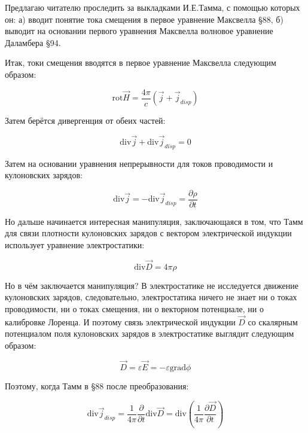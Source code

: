 \documentclass[12pt, a4paper]{article}
\begin{document}
Предлагаю читателю проследить за выкладками И.Е.Тамма, с помощью которых он: а) вводит понятие тока смещения в первое уравнение Максвелла §88, б) выводит на основании первого уравнения Максвелла волновое уравнение Даламбера §94.

Итак, токи смещения вводятся в первое уравнение Максвелла следующим образом:

\begin{equation}
\text{rot} \vec{H} = \frac{4\pi}{c} (\vec{j} + \vec{j}_{disp})
\label{eq:tamm_88}
\end{equation}

Затем берётся дивергенция от обеих частей:

\begin{equation}
\text{div} \vec{j} + \text{div} \vec{j}_{disp} = 0
\label{eq:tamm_div}
\end{equation}

Затем на основании уравнения непрерывности для токов проводимости и кулоновских зарядов:

\begin{equation}
\text{div} \vec{j} = -\text{div} \vec{j}_{disp} = \frac{\partial \rho}{\partial t}
\label{eq:tamm_continuity}
\end{equation}

Но дальше начинается интересная манипуляция, заключающаяся в том, что Тамм для связи плотности кулоновских зарядов с вектором электрической индукции использует уравнение электростатики:

\begin{equation}
\text{div} \vec{D} = 4\pi \rho
\label{eq:tamm_electrostatics}
\end{equation}

Но в чём заключается манипуляция? В электростатике не исследуется движение кулоновских зарядов, следовательно, электростатика ничего не знает ни о токах проводимости, ни о токах смещения, ни о векторном потенциале, ни о калибровке Лоренца. И поэтому связь электрической индукции $\vec{D}$ со скалярным потенциалом поля кулоновских зарядов в электростатике выглядит следующим образом:

\begin{equation}
\vec{D} = \varepsilon \vec{E} = -\varepsilon \text{grad} \phi
\label{eq:D_electrostatics}
\end{equation}

Поэтому, когда Тамм в §88 после преобразования:

\begin{equation}
\text{div} \vec{j}_{disp} = \frac{1}{4\pi} \frac{\partial}{\partial t} \text{div} \vec{D} = \text{div} \left( \frac{1}{4\pi} \frac{\partial \vec{D}}{\partial t} \right)
\label{eq:tamm_disp_derivation}
\end{equation}
\end{document}
